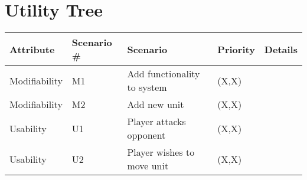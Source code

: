 \section{Utility Tree}
\begin{tabular}{|l|l|l|l|l|}
  \hline
  {\bf Attribute} & {\bf Scenario \#} & {\bf Scenario} & {\bf Priority} &
    {\bf Details} \\ \hline
  Modifiability & M1 & Add functionality to system & (X,X) & \\ \hline
  Modifiability & M2 & Add new unit & (X,X) & \\ \hline
  Usability & U1 & Player attacks opponent & (X,X) & \\ \hline
  Usability & U2 & Player wishes to move unit & (X,X) & \\ \hline
\end{tabular}
